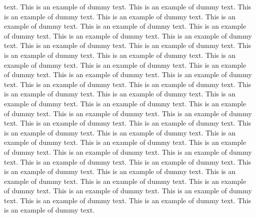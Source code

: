 \documentclass[lineno]{jfm}
\begin{document}
text. This is an example of dummy text. This is an example of dummy text. This is an example of dummy text. This is an example of dummy text. This is an example of dummy text. This is an example of dummy text. This is an example of dummy text. This is an example of dummy text. This is an example of dummy text. This is an example of dummy text. This is an example of dummy text. This is an example of dummy text. This is an example of dummy text. This is an example of dummy text. This is an example of dummy text. This is an example of dummy text. This is an example of dummy text. This is an example of dummy text. This is an example of dummy text. This is an example of dummy text. This is an example of dummy text. This is an example of dummy text. This is an example of dummy text. This is an example of dummy text. This is an example of dummy text. This is an example of dummy text. This is an example of dummy text. This is an example of dummy text. This is an example of dummy text. This is an example of dummy text. This is an example of dummy text. This is an example of dummy text. This is an example of dummy text. This is an example of dummy text. This is an example of dummy text. This is an example of dummy text. This is an example of dummy text. This is an example of dummy text. This is an example of dummy text. This is an example of dummy text. This is an example of dummy text. This is an example of dummy text. This is an example of dummy text. This is an example of dummy text. This is an example of dummy text. This is an example of dummy text. This is an example of dummy text. This is an example of dummy text. 




%
%



\end{document}
